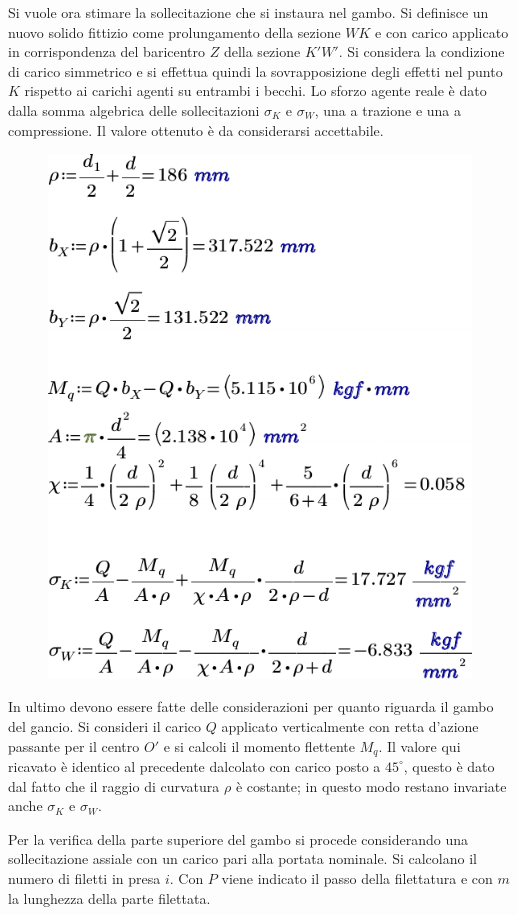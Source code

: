 Si vuole ora stimare la sollecitazione che si instaura nel gambo. 
Si definisce un nuovo solido fittizio come prolungamento della sezione $WK$ e con carico applicato in corrispondenza del baricentro $Z$ della sezione $K'W'$.
Si considera la condizione di carico simmetrico e si effettua quindi la sovrapposizione degli effetti nel punto $K$ rispetto ai carichi agenti su entrambi i becchi. 
Lo sforzo agente reale è dato dalla somma algebrica delle sollecitazioni $\sigma_K$ e $\sigma_W$, una a trazione e una a compressione. Il valore ottenuto è da considerarsi accettabile.
\begin{figure}[H]
\centering
  \includegraphics[width=.4\textwidth]{imgs/Mathcad6}
\caption{}
\label{fig:Mathcad6}
\end{figure}
In ultimo devono essere fatte delle considerazioni per quanto riguarda il gambo del gancio.
Si consideri il carico $Q$ applicato verticalmente con retta d'azione passante per il centro $O'$ e si calcoli il momento flettente $M_q$.
Il valore qui ricavato è identico al precedente dalcolato con carico posto a $45^\circ$, questo è dato dal fatto che il raggio di curvatura $\rho$ è costante; in questo modo restano invariate anche $\sigma_K$ e $\sigma_W$.

Per la verifica della parte superiore del gambo si procede considerando una sollecitazione assiale con un carico pari alla portata nominale.
Si calcolano il numero di filetti in presa $i$. Con $P$ viene indicato il passo della filettatura e con $m$ la lunghezza della parte filettata.

